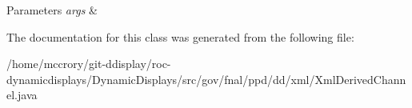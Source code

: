 \begin{DoxyParams}{Parameters}
{\em args} & \\
\hline
\end{DoxyParams}


The documentation for this class was generated from the following file\-:\begin{DoxyCompactItemize}
\item 
/home/mccrory/git-\/ddisplay/roc-\/dynamicdisplays/\-Dynamic\-Displays/src/gov/fnal/ppd/dd/xml/Xml\-Derived\-Channel.\-java\end{DoxyCompactItemize}
